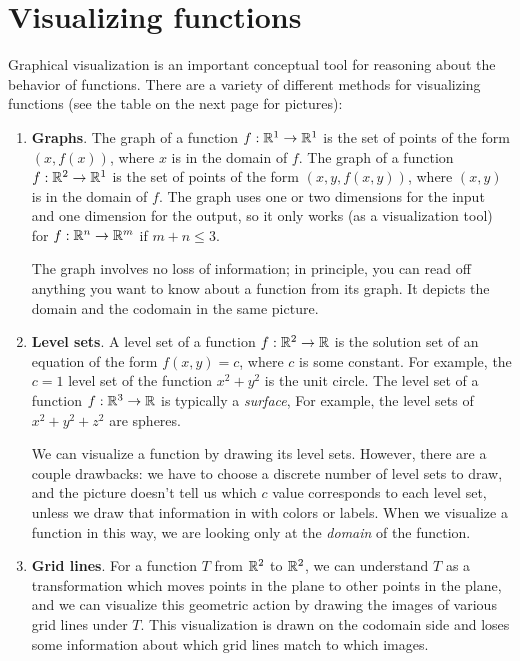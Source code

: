 \documentclass{watsonbook}
\begin{document}
\newpage

\section{Visualizing functions}

  Graphical visualization is an important conceptual tool for reasoning
  about the behavior of functions. There are a variety of different
  methods for visualizing functions (see the table on the next page
  for pictures):

  \begin{tcolorbox}[title = Function Visualization Methods, colback =
    softblue, colframe = MidnightBlue] 
  \begin{enumerate}[leftmargin = 12pt, itemsep = 6pt, parsep = 6pt]
  \item \textbf{Graphs}. The graph of a function $f : \mathbb{R}^1 \to \mathbb{R}^1$ is
    the set of points of the form $(x,f(x))$, where $x$ is in the
    domain of $f$. The graph of a function $f : \mathbb{R}^2 \to \mathbb{R}^1$ is
    the set of points of the form $(x,y,f(x,y))$, where $(x,y)$ is in the
    domain of $f$. The graph uses one or two dimensions for the input
    and one dimension for the output, so it only works (as a
    visualization tool) for $f : \mathbb{R}^n \to \mathbb{R}^m$ if $m + n \leq 3$.

    The graph involves no loss of information; in principle, you can
    read off anything you want to know about a function from its
    graph. It depicts the domain and the codomain in the same picture. 
    
  \item \textbf{Level sets}. A level set of a function $f:\mathbb{R}^2 \to \mathbb{R}$
    is the solution set of an equation of the form $f(x,y) = c$, where
    $c$ is some constant. For example, the $c=1$ level set of the
    function $x^2 + y^2$ is the unit circle. The level set of a
    function $f:\mathbb{R}^3 \to \mathbb{R}$ is typically a \textit{surface}, For
    example, the level sets of $x^2 + y^2 + z^2$ are spheres.

    We can visualize a function by drawing its level sets. However,
    there are a couple drawbacks: we have to choose a discrete number
    of level sets to draw, and the picture doesn't tell us which $c$
    value corresponds to each level set, unless we draw that
    information in with colors or labels. When we visualize a function
    in this way, we are looking only at the \textit{domain} of the
    function. 

  \item \textbf{Grid lines}. For a function $T$ from $\mathbb{R}^2$ to $\mathbb{R}^2$, we can
    understand $T$ as a transformation which moves points in the plane
    to other points in the plane, and we can visualize this geometric
    action by drawing the images of various grid lines under $T$. This
    visualization is drawn on the codomain side and loses some
    information about which grid lines match to which images. 
    

\end{enumerate}
\end{tcolorbox}
\end{document}
